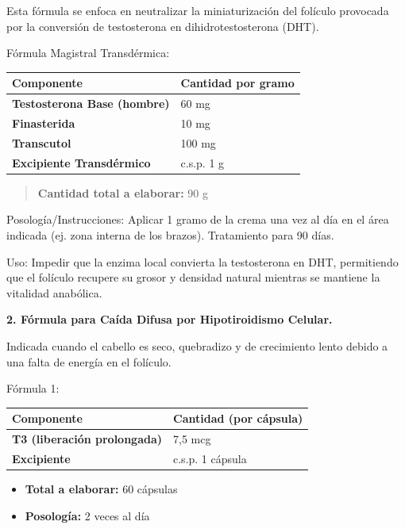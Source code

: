\documentclass[
  spanish,
]{article}
\newcounter{none} %
\providecommand{\tightlist}{%
  \setlength{\itemsep}{0pt}\setlength{\parskip}{0pt}}
\begin{document}
Esta fórmula se enfoca en neutralizar la miniaturización del folículo provocada por la conversión de testosterona en dihidrotestosterona (DHT).

Fórmula Magistral Transdérmica:

{\def\LTcaptype{none} %
\begin{longtable}[]{@{}ll@{}}
\toprule\noalign{}
Componente & Cantidad por gramo \\
\midrule\noalign{}
\endhead
\bottomrule\noalign{}
\endlastfoot
\textbf{Testosterona Base (hombre)} & 60 mg \\
\textbf{Finasterida} & 10 mg \\
\textbf{Transcutol} & 100 mg \\
\textbf{Excipiente Transdérmico} & c.s.p. 1 g \\
\end{longtable}
}

\begin{quote}
\textbf{Cantidad total a elaborar:} 90 g
\end{quote}

Posología/Instrucciones: Aplicar 1 gramo de la crema una vez al día en el área indicada (ej. zona interna de los brazos). Tratamiento para 90 días.

Uso: Impedir que la enzima local convierta la testosterona en DHT, permitiendo que el folículo recupere su grosor y densidad natural mientras se mantiene la vitalidad anabólica.

\textbf{2. Fórmula para Caída Difusa por Hipotiroidismo Celular.}

Indicada cuando el cabello es seco, quebradizo y de crecimiento lento debido a una falta de energía en el folículo.

Fórmula 1:

{\def\LTcaptype{none} %
\begin{longtable}[]{@{}ll@{}}
\toprule\noalign{}
Componente & Cantidad (por cápsula) \\
\midrule\noalign{}
\endhead
\bottomrule\noalign{}
\endlastfoot
\textbf{T3 (liberación prolongada)} & 7,5 mcg \\
\textbf{Excipiente} & c.s.p. 1 cápsula \\
\end{longtable}
}

\begin{itemize}
\tightlist
\item
  \textbf{Total a elaborar:} 60 cápsulas
\item
  \textbf{Posología:} 2 veces al día
\end{itemize}
\end{document}

